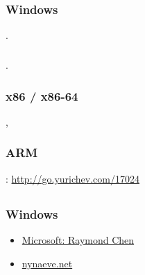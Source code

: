 \part{}
\chapter{}

\section{Windows}

\cite{Russinovich}.

\section{\CCpp}

\cite{CPP11}.

\section{x86 / x86-64}

\cite{Intel}, \cite{AMD}

\section{ARM}

: \url{http://go.yurichev.com/17024}

\section{}

\cite{Schneier}

\chapter{}

\section{Windows}

\begin{itemize}
\item
\href{http://go.yurichev.com/17025}{Microsoft: Raymond Chen}
\item
\href{http://go.yurichev.com/17026}{nynaeve.net}
\end{itemize}

